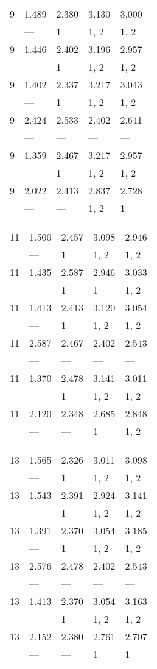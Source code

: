 \begin{tabular}{lllll}
\toprule
 9 & 1.489 & 2.380 & 3.130 & 3.000 \\
   & ---   & 1     & 1, 2  & 1, 2  \\
 9 & 1.446 & 2.402 & 3.196 & 2.957 \\
   & ---   & 1     & 1, 2  & 1, 2  \\
 9 & 1.402 & 2.337 & 3.217 & 3.043 \\
   & ---   & 1     & 1, 2  & 1, 2  \\
 9 & 2.424 & 2.533 & 2.402 & 2.641 \\
   & ---   & ---   & ---   & ---   \\
 9 & 1.359 & 2.467 & 3.217 & 2.957 \\
   & ---   & 1     & 1, 2  & 1, 2  \\
 9 & 2.022 & 2.413 & 2.837 & 2.728 \\
   & ---   & ---   & 1, 2  & 1     \\
\bottomrule
\end{tabular}
\begin{tabular}{lllll}
\toprule
 11 & 1.500 & 2.457 & 3.098 & 2.946 \\
    & ---   & 1     & 1, 2  & 1, 2  \\
 11 & 1.435 & 2.587 & 2.946 & 3.033 \\
    & ---   & 1     & 1     & 1, 2  \\
 11 & 1.413 & 2.413 & 3.120 & 3.054 \\
    & ---   & 1     & 1, 2  & 1, 2  \\
 11 & 2.587 & 2.467 & 2.402 & 2.543 \\
    & ---   & ---   & ---   & ---   \\
 11 & 1.370 & 2.478 & 3.141 & 3.011 \\
    & ---   & 1     & 1, 2  & 1, 2  \\
 11 & 2.120 & 2.348 & 2.685 & 2.848 \\
    & ---   & ---   & 1     & 1, 2  \\
\bottomrule
\end{tabular}
\begin{tabular}{lllll}
\toprule
 13 & 1.565 & 2.326 & 3.011 & 3.098 \\
    & ---   & 1     & 1, 2  & 1, 2  \\
 13 & 1.543 & 2.391 & 2.924 & 3.141 \\
    & ---   & 1     & 1, 2  & 1, 2  \\
 13 & 1.391 & 2.370 & 3.054 & 3.185 \\
    & ---   & 1     & 1, 2  & 1, 2  \\
 13 & 2.576 & 2.478 & 2.402 & 2.543 \\
    & ---   & ---   & ---   & ---   \\
 13 & 1.413 & 2.370 & 3.054 & 3.163 \\
    & ---   & 1     & 1, 2  & 1, 2  \\
 13 & 2.152 & 2.380 & 2.761 & 2.707 \\
    & ---   & ---   & 1     & 1     \\
\bottomrule
\end{tabular}
